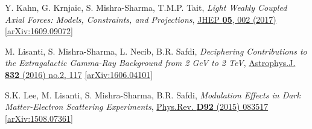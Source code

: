 \documentclass[11pt]{article}
\newenvironment{packed_enumerate}{
\begin{etaremune}
  \setlength{\itemsep}{3pt}
  \setlength{\parskip}{0pt}
  \setlength{\parsep}{0pt}}{\end{etaremune}
}
\begin{document}
\begin{packed_enumerate}
\item Y. Kahn, G. Krnjaic, S. Mishra-Sharma, T.M.P. Tait, \emph{Light Weakly Coupled Axial Forces: Models, Constraints, and Projections},  \href{https://link.springer.com/article/10.1007%2FJHEP05%282017%29002}{JHEP \textbf{05}, 002 (2017)}  \href{https://arxiv.org/abs/1609.09072}{[arXiv:1609.09072]}

\item M. Lisanti, S. Mishra-Sharma, L. Necib, B.R. Safdi, \emph{Deciphering Contributions to the Extragalactic Gamma-Ray Background from 2 GeV to 2 TeV},  \href{http://iopscience.iop.org/article/10.3847/0004-637X/832/2/117/meta}{Astrophys.J. \textbf{832} (2016) no.2, 117} \href{https://arxiv.org/abs/1606.04101}{[arXiv:1606.04101]}

\item S.K. Lee, M. Lisanti, S. Mishra-Sharma, B.R. Safdi, \emph{Modulation Effects in Dark Matter-Electron Scattering Experiments}, \href{https://journals.aps.org/prd/abstract/10.1103/PhysRevD.92.083517}{Phys.Rev. \textbf{D92} (2015) 083517} \href{https://arxiv.org/abs/1508.07361}{[arXiv:1508.07361]}

\end{packed_enumerate}


\vspace{2.0mm}
\end{document}
